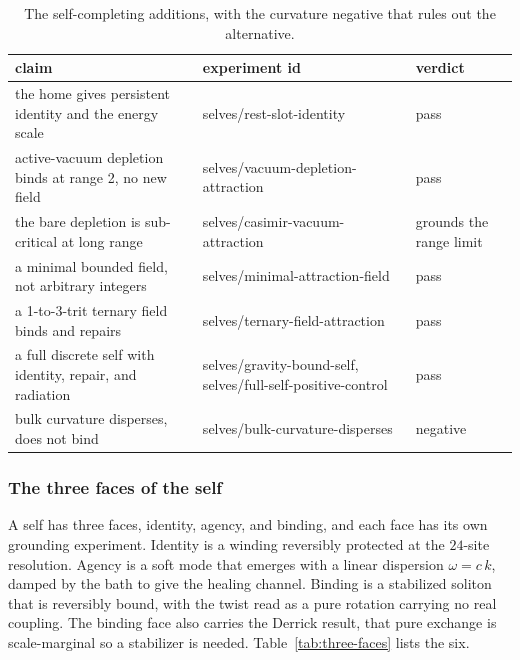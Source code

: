 \begin{table}[ht]
\centering
\begin{tabular}{@{}p{}p{}p{}@{}}
\toprule
claim & experiment id & verdict \\
\midrule
the home gives persistent identity and the energy scale & selves/rest-slot-identity & pass \\
active-vacuum depletion binds at range 2, no new field & selves/vacuum-depletion-attraction & pass \\
the bare depletion is sub-critical at long range & selves/casimir-vacuum-attraction & grounds the range limit \\
a minimal bounded field, not arbitrary integers & selves/minimal-attraction-field & pass \\
a 1-to-3-trit ternary field binds and repairs & selves/ternary-field-attraction & pass \\
a full discrete self with identity, repair, and radiation & selves/gravity-bound-self, selves/full-self-positive-control & pass \\
bulk curvature disperses, does not bind & selves/bulk-curvature-disperses & negative \\
\bottomrule
\end{tabular}
\caption{The self-completing additions, with the curvature negative that rules out the alternative.}
\label{tab:additions}
\end{table}

\subsubsection{The three faces of the self}

A self has three faces, identity, agency, and binding, and each face has its own grounding experiment. Identity is a winding reversibly protected at the $24$-site resolution. Agency is a soft mode that emerges with a linear dispersion $\omega = c\,k$, damped by the bath to give the healing channel. Binding is a stabilized soliton that is reversibly bound, with the twist read as a pure rotation carrying no real coupling. The binding face also carries the Derrick result, that pure exchange is scale-marginal so a stabilizer is needed. Table~\ref{tab:three-faces} lists the six.

